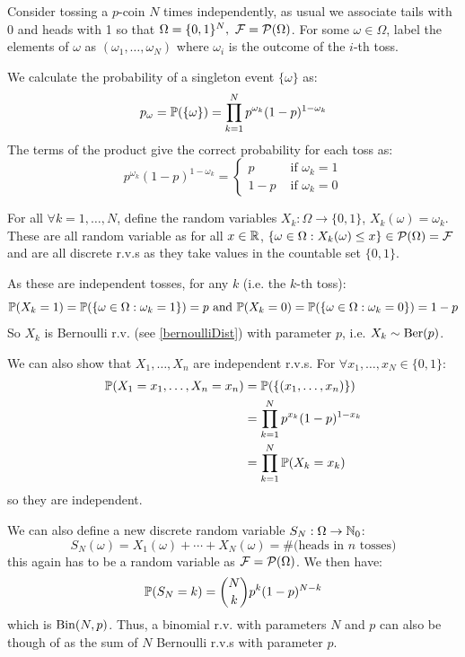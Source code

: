 \documentclass[../main.tex]{subfiles}
\begin{document}
\begin{example}
  \label{binomialAsBernSum}
  Consider tossing a $p$-coin $N$ times independently, as usual we associate tails with 0 and heads with 1 so that $\Omega =\{0, 1\}^{N},\ \salg = \powerset{\Omega}$.
  For some $\omega \in \Omega$, label the elements of $\omega$ as $(\omega_1, \ldots, \omega_N)$ where $\omega_i$ is the outcome of the $i$-th toss.

  We calculate the probability of a singleton event $\{\omega\}$ as:
  \[
    p_\omega = \P(\{\omega\}) = \prod_{k = 1}^{N} p^{\omega_k} (1 - p)^{1 - \omega_k}
  \]
  The terms of the product give the correct probability for each toss as:
  \[
     p^{\omega_k} (1-p)^{1 - \omega_k}= \begin{cases}
     p & \text{ if } \omega_k = 1 \\
     1 - p & \text{ if } \omega_k = 0
    \end{cases}
  \]

  For all $\forall k = 1, \ldots, N$, define the random variables $X_k: \Omega \to \{0, 1\}$, $X_k(\omega) = \omega_k$.
  These are all random variable as for all $x \in \R$, $\{\omega \in \Omega: X_k(\omega) \leq x\} \in \powerset{\Omega} = \salg$ and are all discrete r.v.s as they take values in the countable set $\{0, 1\}$.

  As these are independent tosses, for any $k$ (i.e. the $k$-th toss):
  \[
    \P(X_k = 1) = \P(\{\omega \in \Omega : \omega_k = 1\}) = p \text{ and } \P(X_k = 0) = \P(\{\omega \in \Omega: \omega_k = 0\}) = 1 - p
  \]
  So $X_k$ is Bernoulli r.v. (see \cref{bernoulliDist}) with parameter $p$, i.e. $X_k \sim \ber(p)$.

  We can also show that $X_1, \ldots, X_n$ are independent r.v.s.
  For $\forall x_1, \ldots, x_N \in \{0, 1\}$:
  \begin{align*}
    \P(X_1 = x_1, \ldots, X_n = x_n) &= \P(\{(x_1, \ldots, x_n)\})\\
                                     &= \prod_{k = 1}^{N} p^{x_k}(1 - p)^{1 - x_k} \\
                                     &= \prod_{k = 1}^{N} \P(X_k = x_k)
  \end{align*}
  so they are independent.

  We can also define a new discrete random variable $S_N: \Omega \to \N_0$:
  \[
    S_N(\omega) = X_1(\omega) + \cdots + X_N(\omega) = \text{\#(heads in $n$ tosses)}
  \]
  this again has to be a random variable as $\salg = \powerset{\Omega}$.
  We then have:
  \[
    \P(S_N = k) = \binom{N}{k}p^{k}(1-p)^{N - k}
  \]
  which is $\binomial(N, p)$.
  Thus, a binomial r.v. with parameters $N$ and $p$ can also be though of as the sum of $N$ Bernoulli r.v.s with parameter $p$.
\end{example}
\end{document}
